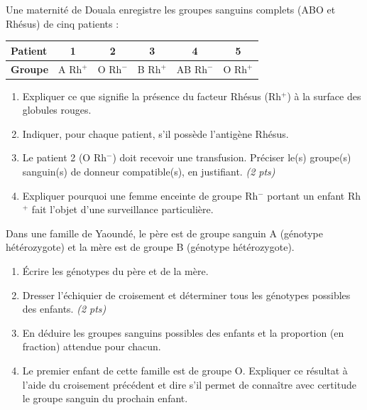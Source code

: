 \documentclass[11pt]{article}
\begin{document}
\begin{exercice}
Une maternité de Douala enregistre les groupes sanguins complets (ABO et Rhésus) de cinq patients :

\begin{center}
\begin{tabular}{|l|c|c|c|c|c|}
\hline
\textbf{Patient} & 1 & 2 & 3 & 4 & 5 \\
\hline
\textbf{Groupe} & A Rh$^+$ & O Rh$^-$ & B Rh$^+$ & AB Rh$^-$ & O Rh$^+$ \\
\hline
\end{tabular}
\end{center}

\begin{enumerate}
\item Expliquer ce que signifie la présence du facteur Rhésus (Rh$^+$) à la surface des globules rouges.
\item Indiquer, pour chaque patient, s'il possède l'antigène Rhésus.
\item Le patient 2 (O Rh$^-$) doit recevoir une transfusion. Préciser le(s) groupe(s) sanguin(s) de donneur compatible(s), en justifiant. \textit{(2 pts)}
\item Expliquer pourquoi une femme enceinte de groupe Rh$^-$ portant un enfant Rh$^+$ fait l'objet d'une surveillance particulière.
\end{enumerate}
\end{exercice}

\begin{exercice}
Dans une famille de Yaoundé, le père est de groupe sanguin A (génotype hétérozygote) et la mère est de groupe B (génotype hétérozygote).
\begin{enumerate}
\item Écrire les génotypes du père et de la mère.
\item Dresser l'échiquier de croisement et déterminer tous les génotypes possibles des enfants. \textit{(2 pts)}
\item En déduire les groupes sanguins possibles des enfants et la proportion (en fraction) attendue pour chacun.
\item Le premier enfant de cette famille est de groupe O. Expliquer ce résultat à l'aide du croisement précédent et dire s'il permet de connaître avec certitude le groupe sanguin du prochain enfant.
\end{enumerate}
\end{exercice}
\end{document}
